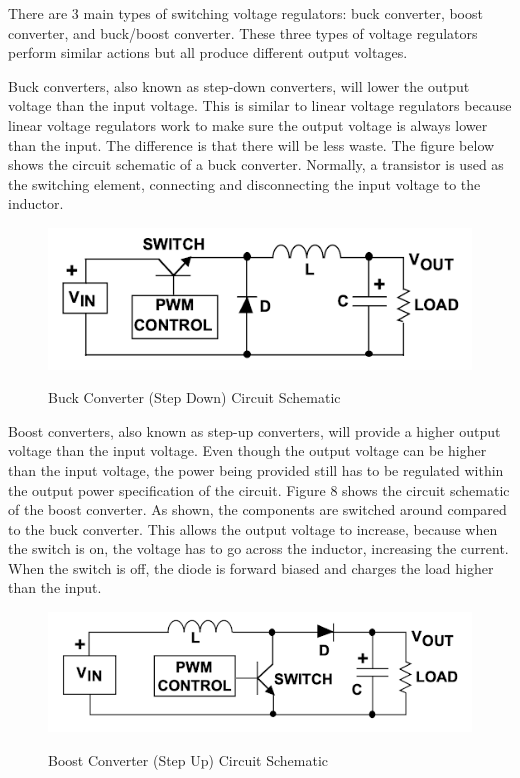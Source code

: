 There are 3 main types of switching voltage regulators: buck converter, boost converter, and buck/boost converter. These three types of voltage regulators perform similar actions but all produce different output voltages.\par
Buck converters, also known as step-down converters, will lower the output voltage than the input voltage. This is similar to linear voltage regulators because linear voltage regulators work to make sure the output voltage is always lower than the input. The difference is that there will be less waste. The figure below shows the circuit schematic of a buck converter. Normally, a transistor is used as the switching element, connecting and disconnecting the input voltage to the inductor. \par
\begin{figure}[H]
    \caption{Buck Converter (Step Down) Circuit Schematic}
    \centering
    \includegraphics[width=\textwidth]{images/Buck_Converter.png}
    \label{fig:buck-converter-schematic}
\end{figure}
Boost converters, also known as step-up converters, will provide a higher output voltage than the input voltage. Even though the output voltage can be higher than the input voltage, the power being provided still has to be regulated within the output power specification of the circuit. Figure 8 shows the circuit schematic of the boost converter. As shown, the components are switched around compared to the buck converter. This allows the output voltage to increase, because when the switch is on, the voltage has to go across the inductor, increasing the current. When the switch is off, the diode is forward biased and charges the load higher than the input.\par
\begin{figure}[H]
    \caption{Boost Converter (Step Up) Circuit Schematic}
    \centering
    \includegraphics[width=\textwidth]{images/Boost_Converter.png}
    \label{fig:boost-converter-schematic}
\end{figure}
